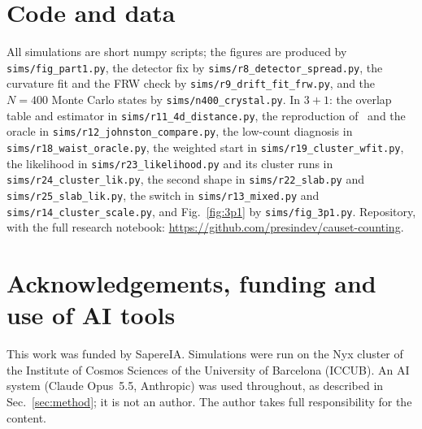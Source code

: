 \documentclass[11pt,a4paper]{article}
\begin{document}
\section*{Code and data}
\sloppy
All simulations are short numpy scripts; the figures are produced by \texttt{sims/fig\_part1.py}, the detector fix by \texttt{sims/r8\_detector\_spread.py}, the curvature fit and the FRW check by \texttt{sims/r9\_drift\_fit\_frw.py}, and the $N=400$ Monte Carlo states by \texttt{sims/n400\_crystal.py}. In $3+1$: the overlap table and estimator in \texttt{sims/r11\_4d\_distance.py}, the reproduction of~\cite{Johnston25} and the oracle in \texttt{sims/r12\_johnston\_compare.py}, the low-count diagnosis in \texttt{sims/r18\_waist\_oracle.py}, the weighted start in \texttt{sims/r19\_cluster\_wfit.py}, the likelihood in \texttt{sims/r23\_likelihood.py} and its cluster runs in \texttt{sims/r24\_cluster\_lik.py}, the second shape in \texttt{sims/r22\_slab.py} and \texttt{sims/r25\_slab\_lik.py}, the switch in \texttt{sims/r13\_mixed.py} and \texttt{sims/r14\_cluster\_scale.py}, and Fig.~\ref{fig:3p1} by \texttt{sims/fig\_3p1.py}. Repository, with the full research notebook: \url{https://github.com/presindev/causet-counting}.

\section*{Acknowledgements, funding and use of AI tools}
This work was funded by SapereIA. Simulations were run on the Nyx cluster of the Institute of Cosmos Sciences of the University of Barcelona (ICCUB). An AI system (Claude Opus~5.5, Anthropic) was used throughout, as described in Sec.~\ref{sec:method}; it is not an author. The author takes full responsibility for the content.

\appendix
\end{document}
